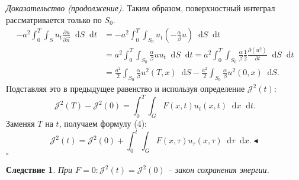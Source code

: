 \documentclass[12pt, a4paper]{article}
\newcommand{\dd}{\mathop{}\!\mathrm{d}} %
\newtheorem{corollary}[theorem]{Следствие}
\newenvironment{proof}[1][\proofname]{\par\noindent\textit{#1.}\quad}{\hfill$\square$}
\renewcommand{\proofname}{Доказательство}
\begin{document}
\begin{proof}[Доказательство (продолжение)]
Таким образом, поверхностный интеграл рассматривается только по $S_0$.
\begin{align*}
- a^2 \int_0^T \int_S u_t \frac{\partial u}{\partial \vec{n}} \dd S \dd t &= - a^2 \int_0^T \int_{S_0} u_t \left(-\frac{\alpha}{\beta} u\right) \dd S \dd t \\
&= a^2 \int_0^T \int_{S_0} \frac{\alpha}{\beta} u u_t \dd S \dd t = a^2 \int_0^T \int_{S_0} \frac{\alpha}{\beta} \frac{1}{2} \frac{\partial (u^2)}{\partial t} \dd S \dd t \\
&= \frac{a^2}{2} \int_{S_0} \frac{\alpha}{\beta} u^2(T,x) \dd S - \frac{a^2}{2} \int_{S_0} \frac{\alpha}{\beta} u^2(0,x) \dd S.
\end{align*}
Подставляя это в предыдущее равенство и используя определение $\mathcal{J}^2(t)$:
$$ \mathcal{J}^2(T) - \mathcal{J}^2(0) = \int_0^T \int_G F(x,t) u_t(x,t) \dd x \dd t. $$
Заменяя $T$ на $t$, получаем формулу (4):
$$ \mathcal{J}^2(t) = \mathcal{J}^2(0) + \int_0^t \int_G F(x,\tau) u_\tau(x,\tau) \dd\tau \dd x. \blacktriangleleft $$
\end{proof}

\begin{corollary}
При $F=0: \mathcal{J}^2(t) = \mathcal{J}^2(0)$ -- закон сохранения энергии.
\end{corollary}
\end{document}
